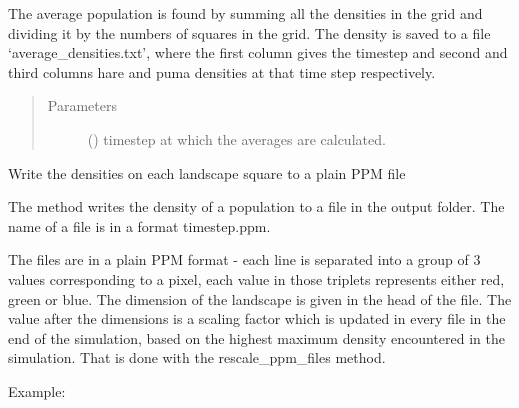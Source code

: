 \documentclass[letterpaper,10pt,english]{sphinxmanual}
\begin{document}
\begin{fulllineitems}
\begin{fulllineitems}
The average population is found by summing all the densities in
the grid and dividing it by the numbers of squares in the grid.
The density is saved to a file ‘average\_densities.txt’, where the first
column gives the timestep and second and third columns hare and puma
densities at that time step respectively.
\begin{quote}\begin{description}
\item[{Parameters}] \leavevmode
{} () \textendash{} timestep at which the averages are calculated.

\end{description}\end{quote}

\end{fulllineitems}


\begin{fulllineitems}
\label{\detokenize{pumha:pumha.sim.Simulation.save_density_grid}}
Write the densities on each landscape square to a plain PPM file

The method writes the density of a population to a file in the output
folder. The name of a file is in a format timestep.ppm.

The files are in a plain PPM format - each line is separated into
a group of 3 values corresponding to a pixel, each value in those
triplets represents either red, green or blue. The dimension
of the landscape is given in the head of the file. The value after
the dimensions is a scaling factor which is updated in every file
in the end of the simulation, based on the highest maximum density
encountered in the simulation. That is done with the
rescale\_ppm\_files method.

Example:

\begin{sphinxVerbatim}[commandchars=\\\{\}]
 
              
              
              
              
\end{sphinxVerbatim}


\end{fulllineitems}
\end{fulllineitems}
\end{document}
